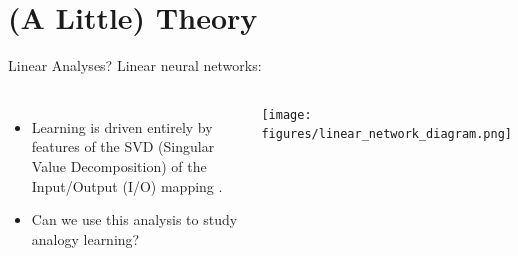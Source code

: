 \documentclass{beamer}
\begin{document}
\section{(A Little) Theory}
\begin{frame}{Linear Analyses?}
Linear neural networks:
\begin{columns}
\begin{itemize}
    \item<2-> Learning is driven entirely by features of the SVD (Singular Value Decomposition) of the Input/Output (I/O) mapping \cite{Saxe2013}.
    \item<3-> Can we use this analysis to study analogy learning?
\end{itemize}
    \texttt{[image: figures/linear\_network\_diagram.png]}
\end{columns}
\end{frame}
\end{document}
